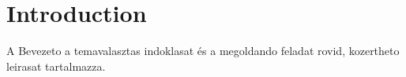 
\chapter{Introduction}

A Bevezeto a temavalasztas indoklasat és a megoldando feladat rovid, kozertheto leirasat tartalmazza.
